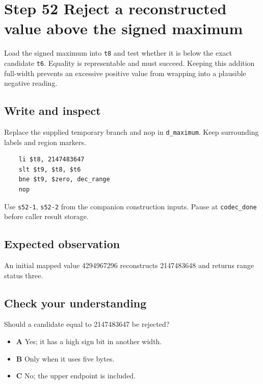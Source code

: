 \section{Step 52 Reject a reconstructed value above the signed maximum}\label{delta-s52}

Load the signed maximum into \texttt{t8} and test whether it is below the exact candidate \texttt{t6}. Equality is representable and must succeed. Keeping this addition full-width prevents an excessive positive value from wrapping into a plausible negative reading.

\subsection{Write and inspect}
Replace the supplied temporary branch and nop in \texttt{d\_maximum}. Keep surrounding labels and region markers.

\begin{verbatim}
    li $t8, 2147483647
    slt $t9, $t8, $t6
    bne $t9, $zero, dec_range
    nop
\end{verbatim}
Use \texttt{s52-1}, \texttt{s52-2} from the companion construction inputs. Pause at \texttt{codec\_done} before caller result storage.

\subsection{Expected observation}
An initial mapped value 4294967296 reconstructs 2147483648 and returns range status three.

\subsection{Check your understanding}
Should a candidate equal to 2147483647 be rejected?

\begin{itemize}
  \item \textbf{A} Yes; it has a high sign bit in another width.
  \item \textbf{B} Only when it uses five bytes.
  \item \textbf{C} No; the upper endpoint is included.
\end{itemize}
